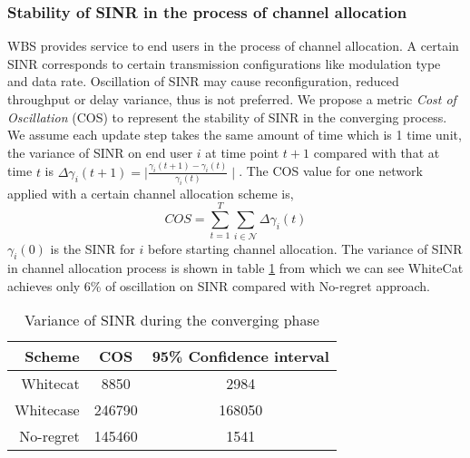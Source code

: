 \subsubsection*{Stability of SINR in the process of channel allocation}
WBS provides service to end users in the process of channel allocation. 
A certain SINR corresponds to certain transmission configurations like modulation type and data rate. Oscillation of SINR may cause reconfiguration, reduced throughput or delay variance, thus is not preferred. We propose a metric \textit{Cost of Oscillation} (\gls{COS}) to represent the stability of SINR in the converging process. We assume each update step takes the same amount of time which is 1 time unit, the variance of SINR on end user $i$ at time point $t+1$ compared with that at time $t$ is $\varDelta  \gamma_i(t+1)=\mid\frac{\gamma_i(t+1)-\gamma_i(t)}{\gamma_i(t)} \mid$. The COS value for one network applied with a certain channel allocation scheme is,
\begin{equation}
\label{cos}
			COS = \sum\limits_{t=1}^T   \sum\limits_{i\in \mathcal{N}} \varDelta  \gamma_i(t)
			\end{equation}
$\gamma_i(0)$ is the SINR for $i$ before starting channel allocation. The variance of SINR in channel allocation process is shown in table \ref{costable} from which we can see WhiteCat achieves only 6\% of oscillation on SINR compared with No-regret approach.
\begin{table}[!h]
\centering
\begin{tabular}{|r|c|c|}
  \hline
  Scheme			 						& COS 					& 95\% Confidence interval\\
    \hline
  Whitecat									& 8850					& 2984\\
  Whitecase 								& 246790 				& 168050\\ %
  No-regret									& 145460				& 1541\\
  \hline
\end{tabular}
\caption{Variance of SINR during the converging phase}
\label{costable}
\end{table}



